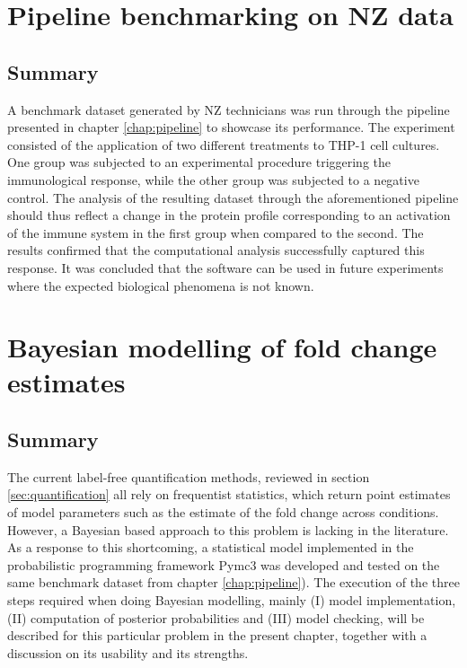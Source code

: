 \documentclass[11pt, a4paper]{report}
\begin{document}
\chapter{Pipeline benchmarking on \ac{NZ} data}
\label{chap:benchmark}

\section*{Summary}

A benchmark dataset generated by \ac{NZ} technicians was run through the pipeline presented in chapter \ref{chap:pipeline} to showcase its performance. The experiment consisted of the application of two different treatments to THP-1 cell cultures. One group was subjected to an experimental procedure triggering the immunological response, while the other group was subjected to a negative control. The analysis of the resulting dataset through the aforementioned pipeline should thus reflect a change in the protein profile corresponding to an activation of the immune system in the first group when compared to the second. The results confirmed that the computational analysis successfully captured this response. It was concluded that the software can be used in future experiments where the expected biological phenomena is not known.



\chapter{Bayesian modelling of fold change estimates}
\label{chap:model}

\section*{Summary}

The current label-free quantification methods, reviewed in section \ref{sec:quantification} all rely on frequentist statistics, which return point estimates of model parameters such as the estimate of the fold change across conditions. However, a Bayesian based approach to this problem is lacking in the literature. As a response to this shortcoming, a statistical model implemented in the probabilistic programming framework Pymc3 was developed and tested on the same benchmark dataset from chapter \ref{chap:pipeline}). The execution of the three steps required when doing Bayesian modelling, mainly (I) model implementation, (II) computation of posterior probabilities and (III) model checking, will be described for this particular problem in the present chapter, together with a discussion on its usability and its strengths.
\end{document}
